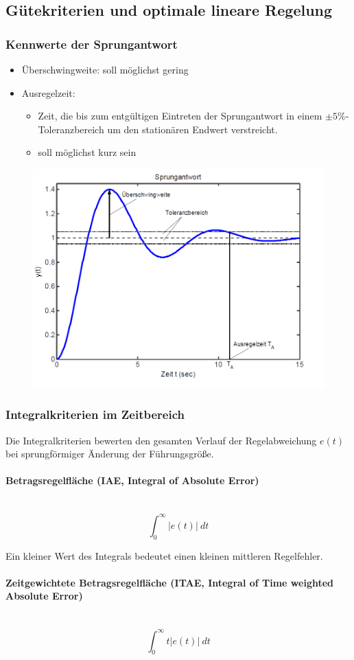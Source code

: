 \documentclass[10pt,a4paper]{article}
\begin{document}
\subsection{Gütekriterien und optimale lineare Regelung}
\subsubsection{Kennwerte der Sprungantwort}
\begin{itemize}
	\item Überschwingweite: soll möglichst gering
	\item Ausregelzeit: \begin{itemize}
		\item Zeit, die bis zum entgültigen Eintreten der Sprungantwort in einem $\pm 5 \%$-Toleranzbereich um den stationären Endwert verstreicht.
		\item soll möglichst kurz sein
	\end{itemize}
\end{itemize}
\begin{figure}[H]
	\includegraphics[width = 0.4\columnwidth]{imgs/sprungantwort_kennwerte.png}
\end{figure}

\subsubsection{Integralkriterien im Zeitbereich}
Die Integralkriterien bewerten den gesamten Verlauf der Regelabweichung $e(t)$ bei sprungförmiger Änderung der Führungsgröße.

\paragraph{Betragsregelfläche (IAE, Integral of Absolute Error)} ~\\
$$
	\int_0^∞ |e(t)| ~dt
$$

Ein kleiner Wert des Integrals bedeutet einen kleinen mittleren Regelfehler.

\paragraph{Zeitgewichtete Betragsregelfläche (ITAE, Integral of Time weighted Absolute Error)} ~\\
$$
	\int_0^∞ t|e(t)| ~dt
$$
\end{document}

